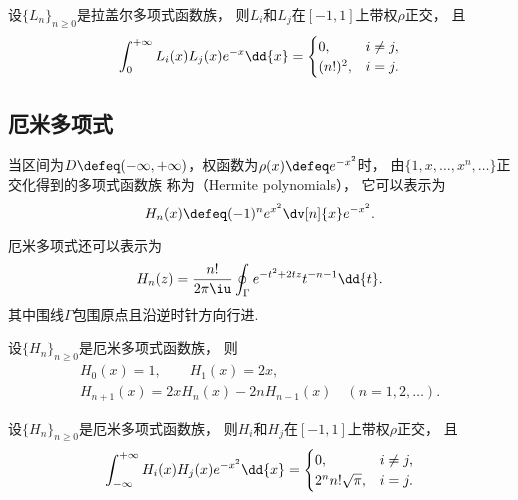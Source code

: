 \begin{property}
设\(\{L_n\}_{n\geq0}\)是拉盖尔多项式函数族，
则\(L_i\)和\(L_j\)在\([-1,1]\)上带权\(\rho\)正交，
且\begin{equation}
	\def\arraystretch{1.5}
	\int_0^{+\infty} L_i(x) L_j(x) e^{-x} \dd{x}
	= \begin{cases}
		0, & i \neq j, \\
		(n!)^2, & i = j.
	\end{cases}
\end{equation}
\end{property}

\subsection{厄米多项式}
当区间为\(D \defeq (-\infty,+\infty)\)，权函数为\(\rho(x) \defeq e^{-x^2}\)时，
由\(\{1,x,\dotsc,x^n,\dotsc\}\)正交化得到的多项式函数族
称为（Hermite polynomials），
它可以表示为\begin{equation}
	H_n(x)
	\defeq
	(-1)^n e^{x^2} \dv[n]{x} e^{-x^2}.
\end{equation}

厄米多项式还可以表示为\begin{equation}
	H_n(z) = \frac{n!}{2\pi\iu} \oint_\Gamma e^{-t^2 + 2 t z} t^{-n-1} \dd{t}.
\end{equation}
其中围线\(\Gamma\)包围原点且沿逆时针方向行进.

\begin{property}
设\(\{H_n\}_{n\geq0}\)是厄米多项式函数族，
则\begin{gather}
	H_0(x) = 1,
	\qquad
	H_1(x) = 2x, \\
	H_{n+1}(x) = 2x H_n(x) - 2n H_{n-1}(x)
	\quad(n=1,2,\dotsc).
\end{gather}
\end{property}

\begin{property}
设\(\{H_n\}_{n\geq0}\)是厄米多项式函数族，
则\(H_i\)和\(H_j\)在\([-1,1]\)上带权\(\rho\)正交，
且\begin{equation}
	\def\arraystretch{1.5}
	\int_{-\infty}^{+\infty} H_i(x) H_j(x) e^{-x^2} \dd{x}
	= \begin{cases}
		0, & i \neq j, \\
		2^n n! \sqrt{\pi}, & i = j.
	\end{cases}
\end{equation}
\end{property}
